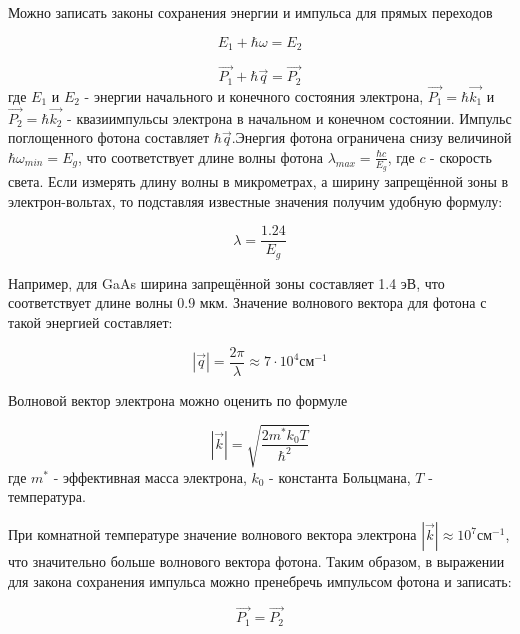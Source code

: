 Можно записать законы сохранения энергии и импульса для прямых переходов

\begin{equation}
E_{1} + \hbar \omega = E_{2}
\end{equation}

\begin{equation}
\overrightarrow{P_{1}} + \hbar \overrightarrow{q} = \overrightarrow{P_{2}}
\end{equation}
где $E_{1}$ и $E_{2}$ - энергии начального и конечного состояния электрона, $\overrightarrow{P_{1}} = \hbar \overrightarrow{k_{1}}$ и $\overrightarrow{P_{2}} = \hbar \overrightarrow{k_{2}}$ - квазиимпульсы электрона в начальном и конечном состоянии. Импульс поглощенного фотона составляет $\hbar \overrightarrow{q}$.Энергия фотона ограничена снизу величиной $\hbar \omega_{min} = E_{g}$, что соответствует длине волны фотона $\lambda_{max} = \frac{\hbar c}{E_{g}}$, где $c$ - скорость света. Если измерять длину волны в микрометрах, а ширину запрещённой зоны в электрон-вольтах, то подставляя известные значения получим удобную формулу:

\begin{equation}
\lambda = \frac{1.24}{E_{g}}
\label{eq6_homega}
\end{equation}

Например, для GaAs ширина запрещённой зоны составляет 1.4 эВ, что соответствует длине волны 0.9 мкм. Значение волнового вектора для фотона с такой энергией составляет:

\begin{equation}
|\overrightarrow{q}| = \frac{2 \pi}{\lambda} \approx 7 \cdot 10^{4}  \text{см}^{-1}
\end{equation}

Волновой вектор электрона можно оценить по формуле

\begin{equation}
|\overrightarrow{k}| = \sqrt{\frac{2 m^{*} k_{0} T}{\hbar^{2}}}
\end{equation}
где $m^{*}$ - эффективная масса электрона, $k_{0}$ - константа Больцмана, $T$ - температура.

При комнатной температуре значение волнового вектора электрона $|\overrightarrow{k}| \approx 10^{7} \text{см}^{-1}$, что значительно больше волнового вектора фотона. Таким образом, в выражении для закона сохранения импульса можно пренебречь импульсом фотона и записать:

\begin{equation}
\overrightarrow{P_{1}} = \overrightarrow{P_{2}}
\end{equation}

